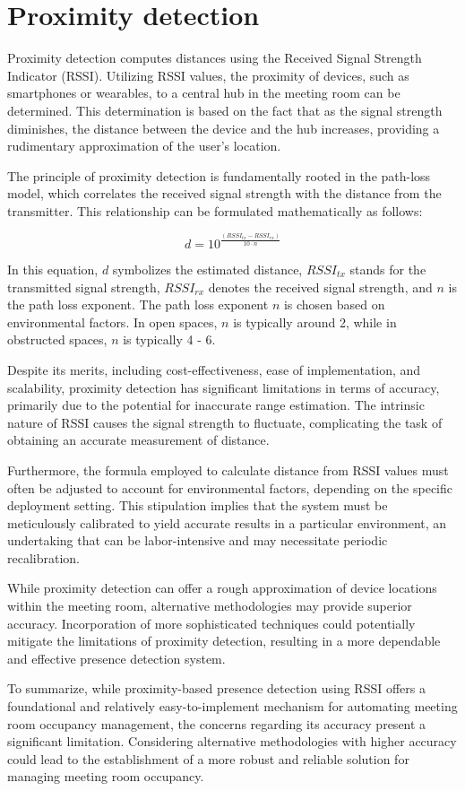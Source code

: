 \section{Proximity detection}\label{sec:proximity_detection}
Proximity detection computes distances using the Received Signal Strength Indicator (RSSI).
Utilizing RSSI values, the proximity of devices, such as smartphones or wearables, to a central hub in the meeting room can be determined. This determination is based on the fact that as the signal strength diminishes, the distance between the device and the hub increases, providing a rudimentary approximation of the user's location.\cite{spachosBLEBeaconsIndoor2020}

The principle of proximity detection is fundamentally rooted in the path-loss model, which correlates the received signal strength with the distance from the transmitter. This relationship can be formulated mathematically as follows:

$$
d = 10^{ \frac{(RSSI_{tx} - RSSI_{rx})}{10 \cdot n}}
$$\cite{spachosBLEBeaconsIndoor2020}

In this equation, \(d\) symbolizes the estimated distance, \(RSSI_{tx}\) stands for the transmitted signal strength, \(RSSI_{rx}\) denotes the received signal strength, and \(n\) is the path loss exponent. The path loss exponent \(n\) is chosen based on environmental factors. In open spaces, \(n\) is typically around 2, while in obstructed spaces, \(n\) is typically 4 - 6.\cite{spachosBLEBeaconsIndoor2020, mathuranathanLogDistancePath2013}

Despite its merits, including cost-effectiveness, ease of implementation, and scalability, proximity detection has significant limitations in terms of accuracy, primarily due to the potential for inaccurate range estimation. The intrinsic nature of RSSI causes the signal strength to fluctuate, complicating the task of obtaining an accurate measurement of distance.\cite{spachosBLEBeaconsIndoor2020}

Furthermore, the formula employed to calculate distance from RSSI values must often be adjusted to account for environmental factors, depending on the specific deployment setting. This stipulation implies that the system must be meticulously calibrated to yield accurate results in a particular environment, an undertaking that can be labor-intensive and may necessitate periodic recalibration.\cite{spachosBLEBeaconsIndoor2020}

While proximity detection can offer a rough approximation of device locations within the meeting room, alternative methodologies may provide superior accuracy. Incorporation of more sophisticated techniques could potentially mitigate the limitations of proximity detection, resulting in a more dependable and effective presence detection system.

To summarize, while proximity-based presence detection using RSSI offers a foundational and relatively easy-to-implement mechanism for automating meeting room occupancy management, the concerns regarding its accuracy present a significant limitation. Considering alternative methodologies with higher accuracy could lead to the establishment of a more robust and reliable solution for managing meeting room occupancy.
